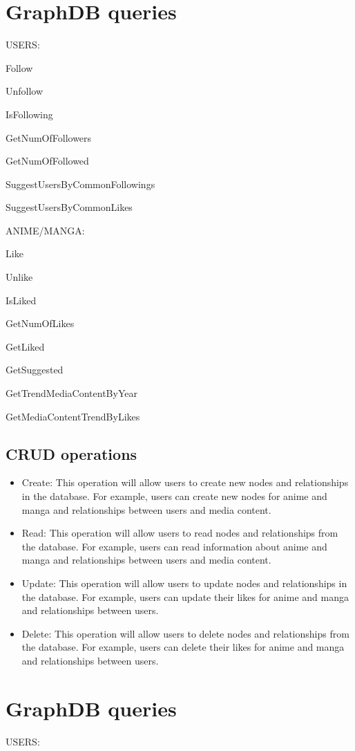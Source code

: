 \section{GraphDB queries}
USERS:


Follow


Unfollow 


IsFollowing 


GetNumOfFollowers


GetNumOfFollowed


SuggestUsersByCommonFollowings


SuggestUsersByCommonLikes


ANIME/MANGA:


Like 


Unlike 


IsLiked


GetNumOfLikes


GetLiked 


GetSuggested 


GetTrendMediaContentByYear


GetMediaContentTrendByLikes


\subsection{CRUD operations}
\begin{itemize}
    \item Create: This operation will allow users to create new nodes and relationships in the database. For example, users can create new nodes for anime and manga and relationships between users and media content.
    \item Read: This operation will allow users to read nodes and relationships from the database. For example, users can read information about anime and manga and relationships between users and media content.
    \item Update: This operation will allow users to update nodes and relationships in the database. For example, users can update their likes for anime and manga and relationships between users.
    \item Delete: This operation will allow users to delete nodes and relationships from the database. For example, users can delete their likes for anime and manga and relationships between users.
\end{itemize}


\section{GraphDB queries}
USERS:


